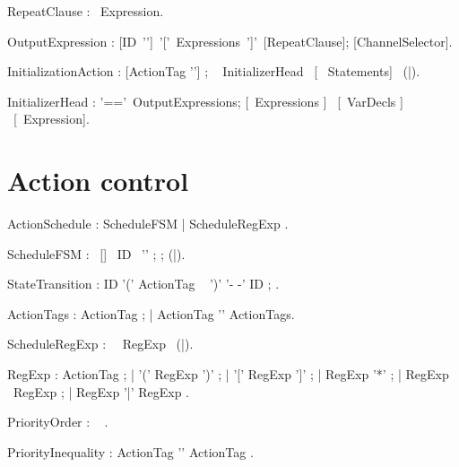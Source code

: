 RepeatClause : \kwRepeat~Expression.

OutputExpression : [ID~'\charColon']~'['~Expressions~']'~[RepeatClause];
 [ChannelSelector].
             
  InitializationAction : [ActionTag
             '\charColon'] ;
     \kwInitialize~ InitializerHead ~[\kwDo
             ~Statements]~ (\kwEnd|\kwEndInitialize).

  InitializerHead : '==\charMore'~OutputExpressions;
             [\kwGuard~Expressions ] ~[\kwVar~VarDecls ] ~[\kwDelay ~Expression].
\egr

\pagebreak[4]

\section{Action control}

\bgr
  ActionSchedule : ScheduleFSM | ScheduleRegExp .

  ScheduleFSM : \kwSchedule ~[\kwFSM] ~ID ~'\charColon' ;
       ;
      (\kwEnd|\kwEndSchedule).

  StateTransition : ID '(' ActionTag ~ ')' '- -\charMore' ID ;
      .

  ActionTags : ActionTag ;
      | ActionTag '\charComma' ActionTags.

  ScheduleRegExp : \kwSchedule ~\kwRegexp ~RegExp ~(\kwEnd|\kwEndSchedule).

  RegExp : ActionTag ;
      | '(' RegExp ')' ;
      | '[' RegExp ']' ;
      | RegExp '*' ;
      | RegExp ~RegExp ;
      | RegExp '|' RegExp .

  PriorityOrder : \kwPriority~  \kwEnd.

  PriorityInequality : ActionTag '\charMore' ActionTag .
\egr



